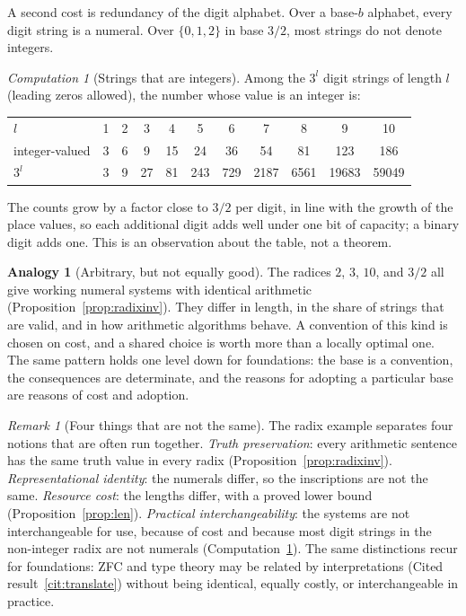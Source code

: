 \documentclass[11pt]{article}
\theoremstyle{definition}
\newtheorem{analogy}[definition]{Analogy}
\theoremstyle{plain}
\theoremstyle{remark}
\newtheorem{remark}[definition]{Remark}
\newtheorem{computation}[definition]{Computation}
\begin{document}
A second cost is redundancy of the digit alphabet. Over a base-$b$ alphabet, every digit string is a numeral. Over $\{0,1,2\}$ in base $3/2$, most strings do not denote integers.

\begin{computation}[Strings that are integers]\label{comp:int}
Among the $3^l$ digit strings of length $l$ (leading zeros allowed), the number whose value is an integer is:
\begin{center}
\small
\begin{tabular}{@{}lcccccccccc@{}}
\toprule
$l$ & 1 & 2 & 3 & 4 & 5 & 6 & 7 & 8 & 9 & 10\\
integer-valued & 3 & 6 & 9 & 15 & 24 & 36 & 54 & 81 & 123 & 186\\
$3^l$ & 3 & 9 & 27 & 81 & 243 & 729 & 2187 & 6561 & 19683 & 59049\\
\bottomrule
\end{tabular}
\end{center}
\end{computation}

The counts grow by a factor close to $3/2$ per digit, in line with the growth of the place values, so each additional digit adds well under one bit of capacity; a binary digit adds one. This is an observation about the table, not a theorem.

\begin{analogy}[Arbitrary, but not equally good]\label{an:radixcost}
The radices $2$, $3$, $10$, and $3/2$ all give working numeral systems with identical arithmetic (Proposition~\ref{prop:radixinv}). They differ in length, in the share of strings that are valid, and in how arithmetic algorithms behave. A convention of this kind is chosen on cost, and a shared choice is worth more than a locally optimal one. The same pattern holds one level down for foundations: the base is a convention, the consequences are determinate, and the reasons for adopting a particular base are reasons of cost and adoption.
\end{analogy}

\begin{remark}[Four things that are not the same]\label{rem:four}
The radix example separates four notions that are often run together. \emph{Truth preservation}: every arithmetic sentence has the same truth value in every radix (Proposition~\ref{prop:radixinv}). \emph{Representational identity}: the numerals differ, so the inscriptions are not the same. \emph{Resource cost}: the lengths differ, with a proved lower bound (Proposition~\ref{prop:len}). \emph{Practical interchangeability}: the systems are not interchangeable for use, because of cost and because most digit strings in the non-integer radix are not numerals (Computation~\ref{comp:int}). The same distinctions recur for foundations: ZFC and type theory may be related by interpretations (Cited result~\ref{cit:translate}) without being identical, equally costly, or interchangeable in practice.
\end{remark}
\end{document}
